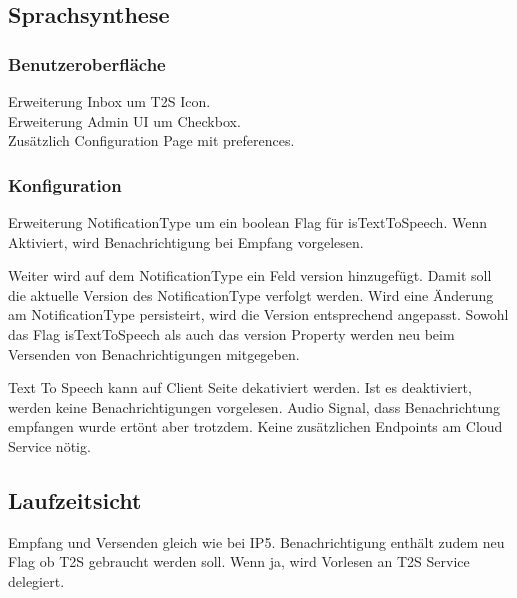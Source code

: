 \subsection{Sprachsynthese}

\subsubsection*{Benutzeroberfläche}

Erweiterung Inbox um T2S Icon. \\
Erweiterung Admin UI um Checkbox. \\
Zusätzlich Configuration Page mit preferences. \\

\subsubsection*{Konfiguration}

Erweiterung NotificationType um ein boolean Flag für isTextToSpeech.
Wenn Aktiviert, wird Benachrichtigung bei Empfang vorgelesen.

Weiter wird auf dem NotificationType ein Feld version hinzugefügt.
Damit soll die aktuelle Version des NotificationType verfolgt werden.
Wird eine Änderung am NotificationType persisteirt, wird die Version entsprechend angepasst.
Sowohl das Flag isTextToSpeech als auch das version Property werden neu beim Versenden von Benachrichtigungen mitgegeben.

Text To Speech kann auf Client Seite dekativiert werden.
Ist es deaktiviert, werden keine Benachrichtigungen vorgelesen.
Audio Signal, dass Benachrichtung empfangen wurde ertönt aber trotzdem.
Keine zusätzlichen Endpoints am Cloud Service nötig. \\

\clearpage

\subsection*{Laufzeitsicht}

Empfang und Versenden gleich wie bei IP5.
Benachrichtigung enthält zudem neu Flag ob T2S gebraucht werden soll.
Wenn ja, wird Vorlesen an T2S Service delegiert.

